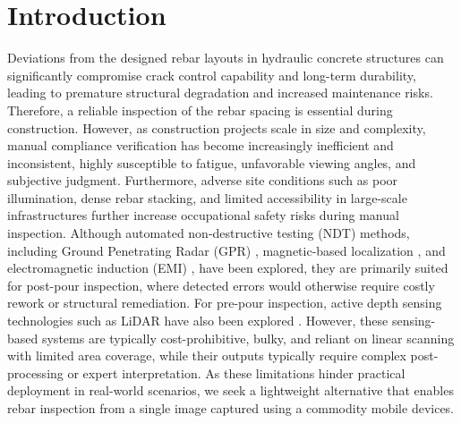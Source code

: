 \documentclass{article}
\begin{document}
\section{Introduction}
\label{sec:intro}

Deviations from the designed rebar layouts in hydraulic concrete structures can significantly compromise crack control capability and long-term durability, leading to premature structural degradation and increased maintenance risks. Therefore, a reliable inspection of the rebar spacing is essential during construction. However, as construction projects scale in size and complexity, manual compliance verification has become increasingly inefficient and inconsistent, highly susceptible to fatigue, unfavorable viewing angles, and subjective judgment. Furthermore, adverse site conditions such as poor illumination, dense rebar stacking, and limited accessibility in large-scale infrastructures further increase occupational safety risks during manual inspection. Although automated non-destructive testing (NDT) methods, including Ground Penetrating Radar (GPR) \cite{Rebar_Cancellation_for_GPR, GPR_YOLO}, magnetic-based localization \cite{SVR-Based_Rebar}, and electromagnetic induction (EMI) \cite{EMI}, have been explored, they are primarily suited for post-pour inspection, where detected errors would otherwise require costly rework or structural remediation. For pre-pour inspection, active depth sensing technologies such as LiDAR have also been explored \cite{LiDAR_2023, sparse_to_dense}. However, these sensing-based systems are typically cost-prohibitive, bulky, and reliant on linear scanning with limited area coverage, while their outputs typically require complex post-processing or expert interpretation. As these limitations hinder practical deployment in real-world scenarios, we seek a lightweight alternative that enables rebar inspection from a single image captured using a commodity mobile devices.
\end{document}
